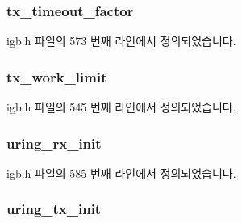 \subsubsection[{\texorpdfstring{tx\+\_\+timeout\+\_\+factor}{tx_timeout_factor}}]{ tx\+\_\+timeout\+\_\+factor}\hypertarget{structigb__adapter_a490167cfddabd97a3d49c1b40ed9c6b6}{}\label{structigb__adapter_a490167cfddabd97a3d49c1b40ed9c6b6}


igb.\+h 파일의 573 번째 라인에서 정의되었습니다.

\subsubsection[{\texorpdfstring{tx\+\_\+work\+\_\+limit}{tx_work_limit}}]{ tx\+\_\+work\+\_\+limit}\hypertarget{structigb__adapter_a38160b23e340e85491e8e4e90facc386}{}\label{structigb__adapter_a38160b23e340e85491e8e4e90facc386}


igb.\+h 파일의 545 번째 라인에서 정의되었습니다.

\subsubsection[{\texorpdfstring{uring\+\_\+rx\+\_\+init}{uring_rx_init}}]{ uring\+\_\+rx\+\_\+init}\hypertarget{structigb__adapter_ac9827ee428dd1c94a27b260995bb2525}{}\label{structigb__adapter_ac9827ee428dd1c94a27b260995bb2525}


igb.\+h 파일의 585 번째 라인에서 정의되었습니다.

\subsubsection[{\texorpdfstring{uring\+\_\+tx\+\_\+init}{uring_tx_init}}]{ uring\+\_\+tx\+\_\+init}\hypertarget{structigb__adapter_ad5021b5f96ba57d48c8c6300cad743af}{}\label{structigb__adapter_ad5021b5f96ba57d48c8c6300cad743af}


